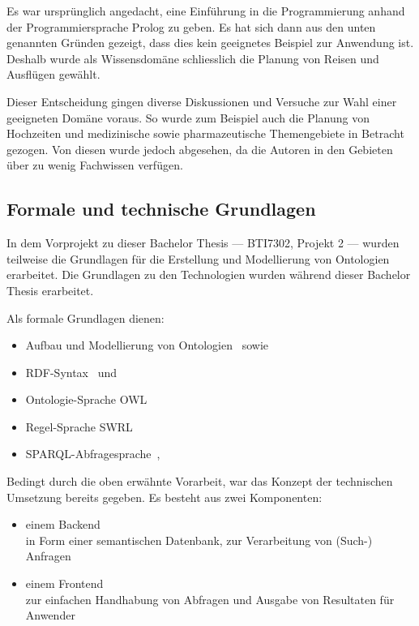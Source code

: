 Es war ursprünglich angedacht, eine Einführung in die Programmierung anhand der Programmiersprache Prolog zu geben. Es hat sich dann aus den unten genannten Gründen gezeigt, dass dies kein geeignetes Beispiel zur Anwendung ist. Deshalb wurde als Wissensdomäne schliesslich die Planung von Reisen und Ausflügen gewählt.

Dieser Entscheidung gingen diverse Diskussionen und Versuche zur Wahl einer geeigneten Domäne voraus. So wurde zum Beispiel auch die Planung von Hochzeiten und medizinische sowie pharmazeutische Themengebiete in Betracht gezogen. Von diesen wurde jedoch abgesehen, da die Autoren in den Gebieten über zu wenig Fachwissen verfügen.

\newpage

\subsection{Formale und technische Grundlagen}
\label{sub:formale_und_technische_grundlagen}
In dem Vorprojekt zu dieser Bachelor Thesis --- BTI7302, Projekt 2 --- wurden teilweise die Grundlagen für die Erstellung und Modellierung von Ontologien erarbeitet. Die Grundlagen zu den Technologien wurden während dieser Bachelor Thesis erarbeitet.

Als formale Grundlagen dienen:
\begin{itemize}
    \item Aufbau und Modellierung von Ontologien~\cite{IspekOntoBedeutung} sowie~\cite{ISpekOntoGeschichte}
    \item RDF-Syntax~\cite{w3rdf} und~\cite{w3rdf_syntax}
    \item Ontologie-Sprache OWL~\cite{w3owl}
    \item Regel-Sprache SWRL~\cite{swrl}
    \item SPARQL-Abfragesprache~\cite{w3sparql_querylang},~\cite{w3sparql_overview}
\end{itemize}

Bedingt durch die oben erwähnte Vorarbeit, war das Konzept der technischen Umsetzung bereits gegeben. Es besteht aus zwei Komponenten:
\begin{itemize}
    \item einem Backend\\
        in Form einer semantischen Datenbank, zur Verarbeitung von (Such-) Anfragen
    \item einem Frontend\\
        zur einfachen Handhabung von Abfragen und Ausgabe von Resultaten für Anwender
\end{itemize}


